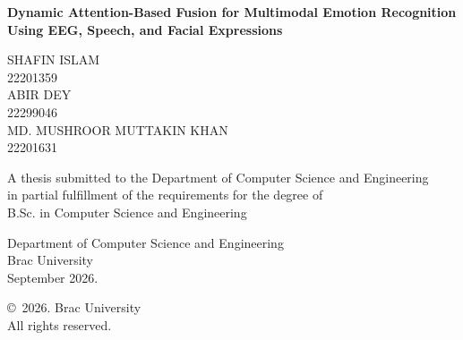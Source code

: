 \begin{titlepage}
\renewcommand*{\thepage}{Title} %

    \begin{center} 
        \vspace*{3cm} %
        
        {\fontsize{20pt}{26pt}\selectfont\textbf{Dynamic Attention-Based Fusion for Multimodal Emotion Recognition Using EEG, Speech, and Facial Expressions}}
        
        \vspace{1.5cm}
        
        
        \vspace{0.5cm}
        
        	SHAFIN ISLAM\\
	        22201359\\
	        ABIR DEY\\
	        22299046\\
	        MD. MUSHROOR MUTTAKIN KHAN\\
	        22201631\\


        \vspace{1.5cm}
        
        	A thesis submitted to the Department of Computer Science and Engineering\\
            in partial fulfillment of the requirements for the degree of\\
            B.Sc. in Computer Science and Engineering

        
        \vspace{2.5cm}
        
    		Department of Computer Science and Engineering\\
            Brac University\\
            September 2026.
        
        \vspace{3cm}
        
    		\copyright\ 2026. Brac University\\
            All rights reserved.
    
    \end{center}

\end{titlepage}